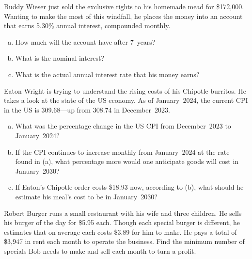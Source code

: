 \documentclass[12pt,letterpaper]{exam}
\begin{document}
\examtitle
{} 
\scores
\bottomline
\newpage


\begin{questions}

\newpage
\question[15] Buddy Wieser just sold the exclusive rights to his homemade mead for \$172,000. Wanting to make the most of this windfall, he places the money into an account that earns 5.30\% annual interest, compounded monthly. 
	\begin{enumerate}[(a)]
	\item How much will the account have after 7~years?
	\item What is the nominal interest? 
	\item What is the actual annual interest rate that his money earns?
	\end{enumerate} 



\newpage
\question[13] Eaton Wright is trying to understand the rising costs of his Chipotle burritos. He takes a look at the state of the US economy. As of January~2024, the current CPI in the US is 309.68---up from 308.74 in December~2023. 
	\begin{enumerate}[(a)]
	\item What was the percentage change in the US CPI from December~2023 to January~2024?
	\item If the CPI continues to increase monthly from January~2024 at the rate found in (a), what percentage more would one anticipate goods will cost in January~2030? 
	\item If Eaton's Chipotle order costs \$18.93 now, according to (b), what should he estimate his meal's cost to be in January~2030?
	\end{enumerate}



\newpage
\question[15] Robert Burger runs a small restaurant with his wife and three children. He sells his burger of the day for \$5.95 each. Though each special burger is different, he estimates that on average each costs \$3.89 for him to make. He pays a total of \$3,947 in rent each month to operate the business. Find the minimum number of specials Bob needs to make and sell each month to turn a profit. 




\end{questions}
\end{document}
